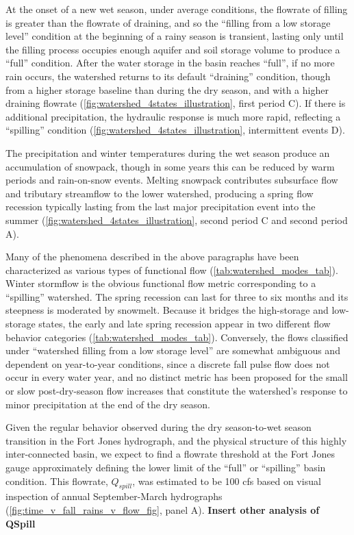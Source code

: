 \documentclass[hess, manuscript]{copernicus}
\begin{document}
At the onset of a new wet season, under average conditions, the flowrate
of filling is greater than the flowrate of draining, and so the
``filling from a low storage level'' condition at the beginning of a
rainy season is transient, lasting only until the filling process
occupies enough aquifer and soil storage volume to produce a ``full''
condition. After the water storage in the basin reaches ``full'', if no
more rain occurs, the watershed returns to its default ``draining''
condition, though from a higher storage baseline than during the dry
season, and with a higher draining flowrate
(\autoref{fig:watershed_4states_illustration}, first period C). If there
is additional precipitation, the hydraulic response is much more rapid,
reflecting a ``spilling'' condition
(\autoref{fig:watershed_4states_illustration}, intermittent events D).

The precipitation and winter temperatures during the wet season produce
an accumulation of snowpack, though in some years this can be reduced by
warm periods and rain-on-snow events. Melting snowpack contributes
subsurface flow and tributary streamflow to the lower watershed,
producing a spring flow recession typically lasting from the last major
precipitation event into the summer
(\autoref{fig:watershed_4states_illustration}, second period C and
second period A).

Many of the phenomena described in the above paragraphs have been
characterized as various types of functional flow
(\autoref{tab:watershed_modes_tab}). Winter stormflow is the obvious
functional flow metric corresponding to a ``spilling'' watershed. The
spring recession can last for three to six months and its steepness is
moderated by snowmelt. Because it bridges the high-storage and
low-storage states, the early and late spring recession appear in two
different flow behavior categories (\autoref{tab:watershed_modes_tab}).
Conversely, the flows classified under ``watershed filling from a low
storage level'' are somewhat ambiguous and dependent on year-to-year
conditions, since a discrete fall pulse flow does not occur in every
water year, and no distinct metric has been proposed for the small or
slow post-dry-season flow increases that constitute the watershed's
response to minor precipitation at the end of the dry season.

Given the regular behavior observed during the dry season-to-wet season
transition in the Fort Jones hydrograph, and the physical structure of
this highly inter-connected basin, we expect to find a flowrate
threshold at the Fort Jones gauge approximately defining the lower limit
of the ``full'' or ``spilling'' basin condition. This flowrate,
\(Q_{spill}\), was estimated to be 100 cfs based on visual inspection of
annual September-March hydrographs
(\autoref{fig:time_v_fall_rains_v_flow_fig}, panel A). \textbf{Insert
other analysis of QSpill}
\end{document}

